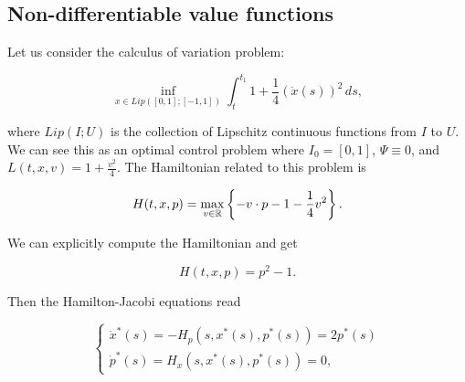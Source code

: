 

\subsection{Non-differentiable value functions}\label{Non diff V}

Let us consider the calculus of variation problem:

\begin{equation}\label{Non diff V-problem}
    \inf_{x\in Lip([0,1];[-1,1])} \int_t^{t_1} 1 + \frac{1}{4}(\dot{x}(s))^2 \,ds,
\end{equation}

where $Lip(I;U)$ is the collection of Lipschitz continuous functions from $I$ to $U$. We can see this as an optimal control problem where $I_0=[0,1]$, $\Psi\equiv 0$, and $L(t,x,v) = 1+\frac{v^2}{4}$. The Hamiltonian related to 
this problem is

\[H(t,x,p) = \max_{v\in \mathbb{R}} \left\{-v\cdot p - 1 - \frac{1}{4}v^2\right\}.\]

We can explicitly compute the Hamiltonian and get

\[H(t,x,p)=p^2-1.\]

Then the Hamilton-Jacobi equations read

\[\begin{cases}
    \dot{x}^{\ast}(s) = -H_p(s,x^{\ast}(s),p^{\ast}(s)) =  2p^{\ast}(s)\\
    \dot{p}^{\ast}(s) = H_x(s,x^{\ast}(s),p^{\ast}(s)) = 0,
\end{cases}\]

